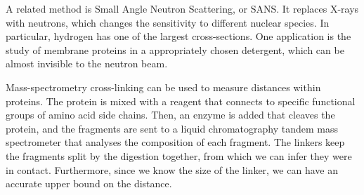 A related method is Small Angle Neutron Scattering, or SANS. 
It replaces X-rays with neutrons, which changes the sensitivity to different nuclear species.
In particular, hydrogen has one of the largest cross-sections.
One application is the study of membrane proteins in a appropriately chosen detergent, which can be almost invisible to the neutron beam.

Mass-spectrometry cross-linking can be used to measure distances within proteins.
The protein is mixed with a reagent that connects to specific functional groups of amino acid side chains.
Then, an enzyme is added that cleaves the protein, and the fragments are sent to a liquid chromatography tandem mass spectrometer that analyses the composition of each fragment.
The linkers keep the fragments split by the digestion together, from which we can infer they were in contact.
Furthermore, since we know the size of the linker, we can have an accurate upper bound on the distance.